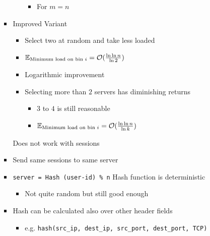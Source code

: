 \begin{itemize}
\begin{itemize}
\begin{itemize}
\begin{itemize}
                                \begin{itemize}
                                    \item For $m = n$
                                \end{itemize}
                        \end{itemize}
                    \item Improved Variant
                        \begin{itemize}
                            \item Select two at random and take less loaded
                            \item $\mathbb{E}_{\text{Minimum load on bin } i} = \mathcal{O}(\frac{\ln \ln n}{\ln 2})$
                            \item Logarithmic improvement
                            \item Selecting more than $2$ servers has diminishing returns
                                \begin{itemize}
                                    \item $3$ to $4$ is still reasonable
                                    \item $\mathbb{E}_{\text{Minimum load on bin } i} = \mathcal{O}(\frac{\ln \ln n}{\ln k})$
                                \end{itemize}
                        \end{itemize}
                    \icon Does not work with sessions
                \end{itemize}
                \begin{itemize}
                    \item Send same sessions to same server
                    \item \verb+server = Hash (user-id) % n+
                    \icon Hash function is deterministic
                        \begin{itemize}
                            \item Not quite random but still good enough
                        \end{itemize}
                    \item Hash can be calculated also over other header fields
                        \begin{itemize}
                            \item e.g. \verb+hash(src_ip, dest_ip, src_port, dest_port, TCP)+

\end{itemize}
\end{itemize}
\end{itemize}
\end{itemize}
